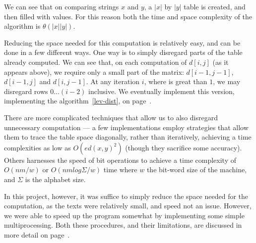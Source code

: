 We can see that on comparing strings $x$ and $y$, a
$|x|$ by $|y|$ table is created, and then filled with values. For this
reason both the time and space complexity of the algorithm is $\theta
(|x||y|)$.

Reducing the space needed for this computation is relatively easy, and
can be done in a few different ways. One way is to simply disregard
parts of the table already computed. We can see that, on each
computation of $d[i,j]$ (as it appears above), we require only a small
part of the matrix: $d[i-1,j-1]$, $d[i-1,j]$ and $d[i,j-1]$. At any
iteration $i$, where is great than $1$, we may disregard rows $0 \dots
(i-2)$ inclusive. We eventually implement this version, implementing
the algorithm~\ref{lev-dist}, on page~\pageref{lev-dist}.

There are more complicated techniques that allow us to also disregard
unnecessary computation --- a few implementations employ strategies
that allow them to trace the table space diagonally, rather than
iteratively, achieving a time complexities as low as $O(ed(x, y)^2)$
(though they sacrifice some accuracy).\cite{Chang1992} Others
harnesses the speed of bit operations to achieve a time complexity of
$O(nm/w)$ or $O(nm log {\Sigma}/w)$ time where $w$ the bit-word size
of the machine, and $\Sigma$ is the alphabet
size.\cite{Myers1999}\cite{Hyyro2003}

In this project, however, it was suffice to simply reduce the space
needed for the computation, as the texts were relatively small, and
speed not an issue. However, we were able to speed up the program
somewhat by implementing some simple multiprocessing. Both these
procedures, and their limitations, are discussed in more detail on
page~\pageref{multiprocessing-bit}.


